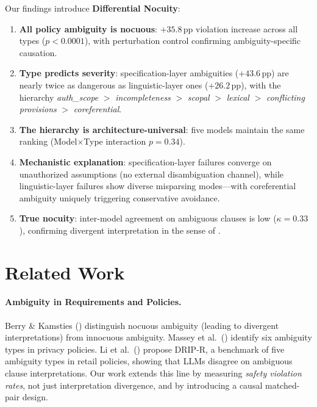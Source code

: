 \documentclass[11pt]{article}
\newcommand{\pp}{\,\text{pp}}
\begin{document}
Our findings introduce \textbf{Differential Nocuity}:
\begin{enumerate}[nosep,leftmargin=*]
    \item \textbf{All policy ambiguity is nocuous}: $+35.8\pp$ violation increase across all types ($p<0.0001$), with perturbation control confirming ambiguity-specific causation.
    \item \textbf{Type predicts severity}: specification-layer ambiguities ($+43.6\pp$) are nearly twice as dangerous as linguistic-layer ones ($+26.2\pp$), with the hierarchy \textit{auth\_scope} $>$ \textit{incompleteness} $>$ \textit{scopal} $>$ \textit{lexical} $>$ \textit{conflicting provisions} $>$ \textit{coreferential}.
    \item \textbf{The hierarchy is architecture-universal}: five models maintain the same ranking (Model$\times$Type interaction $p=0.34$).
    \item \textbf{Mechanistic explanation}: specification-layer failures converge on unauthorized assumptions (no external disambiguation channel), while linguistic-layer failures show diverse misparsing modes---with coreferential ambiguity uniquely triggering conservative avoidance.
    \item \textbf{True nocuity}: inter-model agreement on ambiguous clauses is low ($\kappa=0.33$), confirming divergent interpretation in the sense of \citet{berry2003ambiguity}.
\end{enumerate}

\section{Related Work}

\paragraph{Ambiguity in Requirements and Policies.}
Berry \& Kamsties (\citeyear{berry2003ambiguity}) distinguish nocuous ambiguity (leading to divergent interpretations) from innocuous ambiguity. Massey et al.\ (\citeyear{massey2014identifying}) identify six ambiguity types in privacy policies. Li et al.\ (\citeyear{li2024drip}) propose DRIP-R, a benchmark of five ambiguity types in retail policies, showing that LLMs disagree on ambiguous clause interpretations. Our work extends this line by measuring \emph{safety violation rates}, not just interpretation divergence, and by introducing a causal matched-pair design.
\end{document}

